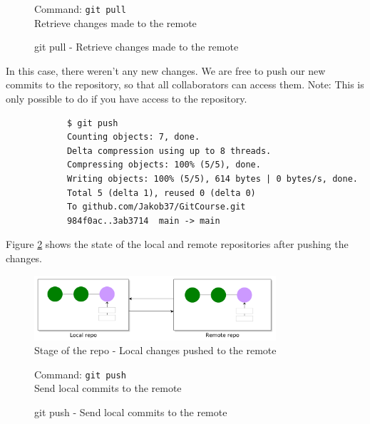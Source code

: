 \documentclass[../main/git_course_main.tex]{subfiles}
\begin{document}
	\begin{figure}
		\begin{bluebox}
			Command: \verb$git pull$ \\
			
			Retrieve changes made to the remote
		\end{bluebox}
		\label{command:pull}
		\caption{git pull - Retrieve changes made to the remote}
	\end{figure}
	
	In this case, there weren't any new changes. We are free to push our new commits to the repository, so that all collaborators can access them. Note: This is only possible to do if you have access to the repository.
	
	\begin{codebox}
		\begin{lstlisting}
			$ git push
			Counting objects: 7, done.
			Delta compression using up to 8 threads.
			Compressing objects: 100% (5/5), done.
			Writing objects: 100% (5/5), 614 bytes | 0 bytes/s, done.
			Total 5 (delta 1), reused 0 (delta 0)
			To github.com/Jakob37/GitCourse.git
			984f0ac..3ab3714  main -> main
		\end{lstlisting}
	\end{codebox}
	
	Figure \ref{fig:changes_pushed} shows the state of the local and remote repositories after pushing the changes.
	
	\begin{figure}[h!]
		\centering
		\includegraphics[width=0.8\textwidth]{../visualizations/chapter5/54_changes_pushed.pdf}
		\caption{Stage of the repo - Local changes pushed to the remote}
		\label{fig:changes_pushed}
	\end{figure}
	
	\begin{figure}
		\begin{bluebox}
			Command: \verb$git push$ \\
			
			Send local commits to the remote
		\end{bluebox}
		\label{command:pull}
		\caption{git push - Send local commits to the remote}
	\end{figure}
	
\end{document}
